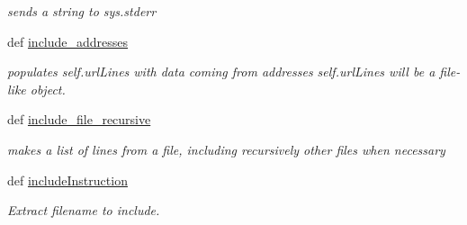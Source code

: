 \begin{DoxyCompactItemize}
\begin{DoxyCompactList}\small\item\em sends a string to sys.\-stderr \end{DoxyCompactList}\item 
def \hyperlink{classuicilibris_1_1wikiParser_1_1wikiParser_a3ce63812d8f61757627343437a74ce48}{include\-\_\-addresses}
\begin{DoxyCompactList}\small\item\em populates self.\-url\-Lines with data coming from addresses self.\-url\-Lines will be a file-\/like object. \end{DoxyCompactList}\item 
def \hyperlink{classuicilibris_1_1wikiParser_1_1wikiParser_a2af2d56994cbc429e28597a3e1037447}{include\-\_\-file\-\_\-recursive}
\begin{DoxyCompactList}\small\item\em makes a list of lines from a file, including recursively other files when necessary \end{DoxyCompactList}\item 
def \hyperlink{classuicilibris_1_1wikiParser_1_1wikiParser_a905ed62b491b474dadfd86d3e44da0ba}{include\-Instruction}
\begin{DoxyCompactList}\small\item\em \-Extract filename to include. \end{DoxyCompactList}\end{DoxyCompactItemize}
